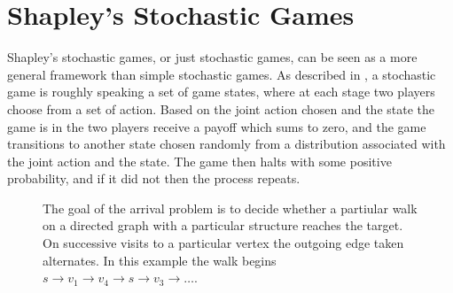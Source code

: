 \section{Shapley's Stochastic Games}
Shapley's stochastic games, or just stochastic games,
can be seen as a more general framework than simple stochastic games.
As described in \citep{shapley}, a stochastic game is roughly speaking
a set of game states, where at each stage two players choose from
a set of action. Based on the joint action chosen and the state the game is in
the two players receive a payoff which sums to zero, and
the game transitions to another state chosen randomly from a distribution
associated with the joint action and the state. The game then halts
with some positive probability, and if it did not then the process repeats.
\begin{figure}[h]
  \centering
  
  \caption{The goal of the arrival problem is to decide whether a partiular walk on a directed graph with a particular
  structure reaches the target. On successive visits to a particular
  vertex the outgoing edge taken alternates. In this example
  the walk begins $s \to v_1 \to v_4 \to s \to v_3 \to \ldots$.} 
\end{figure}
